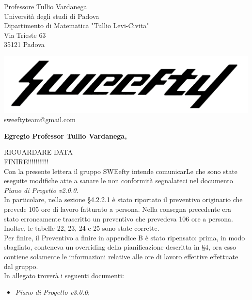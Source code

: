 \documentclass[12pt]{letter} %
\date{24/3/2018} %
\begin{document}



\begin{letter}{Professore Tullio Vardanega \\ Università degli studi di Padova \\ Dipartimento di Matematica "Tullio Levi-Civita" \\ Via Trieste 63 \\ 35121 Padova} %

\begin{center}
\includegraphics[width=\linewidth]{../../CommonImages/logo.jpg}
sweeftyteam@gmail.com
\end{center}

\opening{\textbf{Egregio Professor Tullio Vardanega,}}
\begin{addmargin}[2em]{2em}
  \hspace{1cm}
  RIGUARDARE DATA\\
  FINIRE!!!!!!!!!!!\\
  Con la presente lettera il gruppo SWEefty intende comunicarLe che sono state eseguite modifiche atte a sanare le non conformità segnalateci nel documento \emph{Piano di Progetto v2.0.0}.\\
  In particolare, nella sezione §4.2.2.1 è stato riportato il preventivo originario che prevede 105 ore di lavoro fatturato a persona. Nella consegna precedente era stato erroneamente trascritto un preventivo che prevedeva 106 ore a persona.\\
  Inoltre, le tabelle 22, 23, 24 e 25 sono state corrette.\\
  Per finire, il Preventivo a finire in appendice B è stato ripensato: prima, in modo sbagliato, conteneva un overriding della pianificazione descritta in §4, ora esso contiene solamente le informazioni relative alle ore di lavoro effettive effettuate dal gruppo.
  \\
In allegato troverà i seguenti documenti:
\begin{itemize}
	\item \emph{Piano di Progetto v3.0.0};
\end{itemize}


\end{addmargin}
\end{letter}
\end{document}
